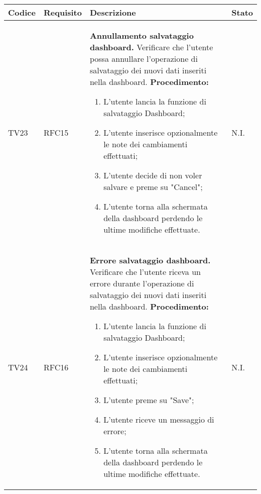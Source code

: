 \begin{table}[!htpb]
	\centering
	\renewcommand{\arraystretch}{2} 
	\begin{tabular}{|l|l|p{10cm}|l|}
		\rowcolor{orange!50}
		\hline
		\textbf{Codice} & \textbf{Requisito}& \textbf{Descrizione} & \textbf{Stato}\\ 
		\hline
		TV23 & RFC15 &
			\textbf{Annullamento salvataggio dashboard.} 
			\newline
			Verificare che l’utente possa annullare l'operazione di salvataggio dei nuovi dati inseriti nella dashboard. 
			\newline 
			\textbf{Procedimento:} 
			\begin{enumerate} 
				\item L'utente lancia la funzione di salvataggio Dashboard; 
				\item L'utente inserisce opzionalmente le note dei cambiamenti effettuati; 
				\item L'utente decide di non voler salvare e preme su "Cancel"; 
				\item L'utente torna alla schermata della dashboard perdendo le ultime modifiche effettuate.		
			\end{enumerate} 
			& N.I.\\
		\hline
		TV24 & RFC16 &
			\textbf{Errore salvataggio dashboard.} 
			\newline
			Verificare che l’utente riceva un errore durante l'operazione di salvataggio dei nuovi dati inseriti nella dashboard. 
			\newline 
			\textbf{Procedimento:} 
			\begin{enumerate} 
				\item L'utente lancia la funzione di salvataggio Dashboard; 
				\item L'utente inserisce opzionalmente le note dei cambiamenti effettuati; 
				\item L'utente preme su "Save"; 
				\item L'utente riceve un messaggio di errore;
				\item L'utente torna alla schermata della dashboard perdendo le ultime modifiche effettuate.		
			\end{enumerate} 
			& N.I.\\
		\hline
	\end{tabular}
\end{table}

